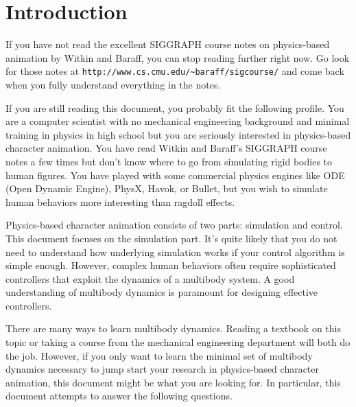 \section{Introduction}
If you have not read the excellent SIGGRAPH course notes on
physics-based animation by Witkin and Baraff, you can stop reading
further right now. Go look for those notes at
{\tt http://www.cs.cmu.edu/\textasciitilde baraff/sigcourse/} and come back when
you fully understand everything in the notes.

If you are still reading this document, you probably fit the following
profile. You are a computer scientist with no mechanical engineering
background and minimal training in physics in high school but you are
seriously interested in physics-based character animation. You have
read Witkin and Baraff's SIGGRAPH course notes a few times but don't
know where to go from simulating rigid bodies to human figures. You
have played with some commercial physics engines like ODE (Open
Dynamic Engine), PhysX, Havok, or Bullet, but you wish to
simulate human behaviors more interesting than ragdoll effects.

Physics-based character animation consists of two parts: simulation
and control. This document focuses on the simulation part. It's quite
likely that you do not need to understand how underlying simulation
works if your control algorithm is simple enough. However, complex
human behaviors often require sophisticated controllers that exploit
the dynamics of a multibody system. A good understanding of multibody
dynamics is paramount for designing effective controllers.

There are many ways to learn multibody dynamics. Reading a textbook
on this topic or taking a course from the mechanical engineering
department will both do the job. However, if you only want to learn
the minimal set of multibody dynamics necessary to jump start your
research in physics-based character animation, this document might be
what you are looking for. In particular, this document attempts to
answer the following questions.

